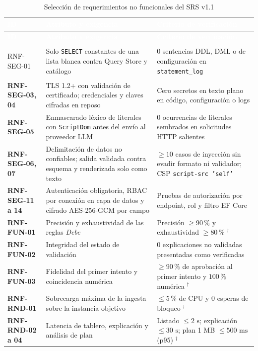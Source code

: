\documentclass[12pt,a4paper]{article}
\newcommand{\dagsym}{\ensuremath{^{\dagger}}}
\begin{document}
\begingroup
{}
\scriptsize
\begin{longtable}{>{\bfseries}p{} p{} p{}}
\toprule
\rowcolor{utbblue}
\textcolor{white}{\textbf{ID}} & \textcolor{white}{\textbf{Atributo y exigencia}} & \textcolor{white}{\textbf{Criterio de verificación}} \\
\midrule
\endfirsthead
\toprule
\rowcolor{utbblue}
\textcolor{white}{\textbf{ID}} & \textcolor{white}{\textbf{Atributo y exigencia}} & \textcolor{white}{\textbf{Criterio de verificación}} \\
\midrule
\endhead
\bottomrule
\caption{Selección de requerimientos no funcionales del SRS v1.1}
\label{tab:rnf-resumen}
\endlastfoot
RNF-SEG-01 & Solo \texttt{SELECT} constantes de una lista blanca contra Query Store y catálogo & 0 sentencias DDL, DML o de configuración en \texttt{statement\_log} \\
RNF-SEG-03, 04 & TLS 1.2+ con validación de certificado; credenciales y claves cifradas en reposo & Cero secretos en texto plano en código, configuración o logs \\
RNF-SEG-05 & Enmascarado léxico de literales con \texttt{ScriptDom} antes del envío al proveedor LLM & 0 ocurrencias de literales sembrados en solicitudes HTTP salientes \\
RNF-SEG-06, 07 & Delimitación de datos no confiables; salida validada contra esquema y renderizada solo como texto & $\ge 10$ casos de inyección sin evadir formato ni validador; CSP \texttt{script-src 'self'} \\
RNF-SEG-11 a 14 & Autenticación obligatoria, RBAC por conexión en capa de datos y cifrado AES-256-GCM por campo & Pruebas de autorización por endpoint, rol y filtro EF Core \\
RNF-FUN-01 & Precisión y exhaustividad de las reglas \textit{Debe} & Precisión $\ge 90\,\%$ y exhaustividad $\ge 80\,\%$ \dagsym{} \\
RNF-FUN-02 & Integridad del estado de validación & 0 explicaciones no validadas presentadas como verificadas \\
RNF-FUN-03 & Fidelidad del primer intento y coincidencia numérica & $\ge 90\,\%$ de aprobación al primer intento y $100\,\%$ numérica \dagsym{} \\
RNF-RND-01 & Sobrecarga máxima de la ingesta sobre la instancia objetivo & $\le 5\,\%$ de CPU y 0 esperas de bloqueo \dagsym{} \\
RNF-RND-02 a 04 & Latencia de tablero, explicación y análisis de plan & Listado $\le 2\text{ s}$; explicación $\le 30\text{ s}$; plan 1 MB $\le 500\text{ ms}$ (p95) \dagsym{} \\

\end{longtable}
\end{document}
